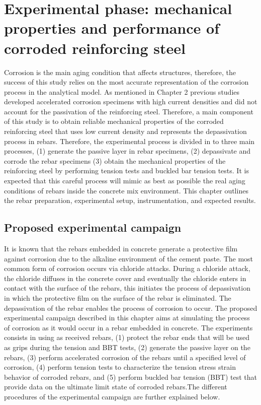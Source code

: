 \chapter{Experimental phase: mechanical properties and performance of corroded reinforcing steel}
\label{chap-three}

Corrosion is the main aging condition that affects structures, therefore, the success of this study relies on the most accurate representation of the corrosion process in the analytical model. As mentioned in Chapter 2 previous studies developed accelerated corrosion specimens with high current densities and did not account for the passivation of the reinforcing steel. Therefore, a main component of this study is to obtain reliable mechanical properties of the corroded reinforcing steel that uses low current density and represents the depassivation process in rebars. Therefore, the experimental process is divided in to three main processes, (1) generate the passive layer in rebar specimens, (2) depassivate and corrode the rebar specimens (3) obtain the mechanical properties of the reinforcing steel by performing tension tests and buckled bar tension tests. It is expected that this careful process will mimic as best as possible the real aging conditions of rebars inside the concrete mix environment. This chapter outlines the rebar preparation, experimental setup, instrumentation, and expected results.

\section{Proposed experimental campaign}

It is known that the rebars embedded in concrete generate a protective film against corrosion due to the alkaline environment of the cement paste. The most common form of corrosion occurs via chloride attacks. During a chloride attack, the chloride diffuses in the concrete cover and eventually the chloride enters in contact with the surface of the rebars, this initiates the process of depassivation in which the protective film on the surface of the rebar is eliminated. The depassivation of the rebar enables the process of corrosion to occur. The proposed experimental campaign described in this chapter aims at simulating the process of corrosion as it would occur in a rebar embedded in concrete. The experiments consists in using as received rebars, (1) protect the rebar ends that will be used as grips during the tension and BBT tests, (2)  generate the passive layer on the rebars, (3) perform accelerated corrosion  of the rebars until a specified level of corrosion, (4) perform tension tests to characterize the tension stress strain behavior of corroded rebars, and (5) perform buckled bar tension (BBT) test that provide data on the ultimate limit state of corroded rebars.The different procedures of the experimental campaign are further explained below.

